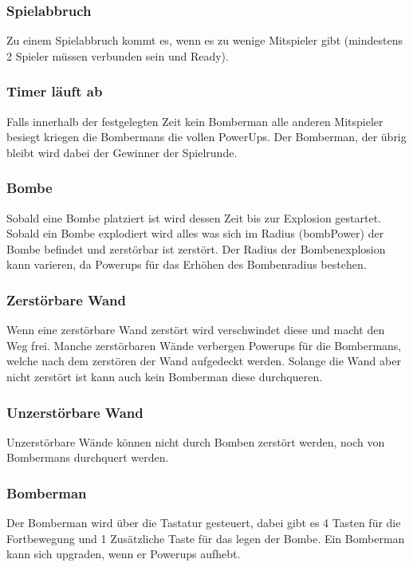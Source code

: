 \documentclass[11pt]{scrartcl}
\begin{document}
\subsubsection{Spielabbruch}
\label{sec:Spielabbruch}
Zu einem Spielabbruch kommt es, wenn es zu wenige Mitspieler gibt 
(mindestens 2 Spieler müssen verbunden sein und Ready).

\subsubsection{Timer läuft ab}
\label{sec:Timer läuft ab}
Falls innerhalb der festgelegten Zeit kein Bomberman alle anderen Mitspieler besiegt 
kriegen die Bombermans die vollen PowerUps.
Der Bomberman, der übrig bleibt wird dabei der Gewinner der Spielrunde.

\subsubsection{Bombe}
\label{sec:Bombe}
Sobald eine Bombe platziert ist wird dessen \grqq{}Zeit 
bis zur Explosion gestartet\grqq{}.
Sobald ein Bombe explodiert wird alles was sich im Radius 
(bombPower) der Bombe befindet und zerstörbar ist zerstört.
Der Radius der Bombenexplosion kann varieren, da Powerups 
für das Erhöhen des Bombenradius bestehen.
\subsubsection{Zerstörbare Wand}
\label{sec:Zerstörbare Wand (DestroyableBlock)}
Wenn eine zerstörbare Wand zerstört wird verschwindet diese und macht den Weg frei.
Manche zerstörbaren Wände verbergen Powerups für die Bombermans, 
welche nach dem zerstören der Wand aufgedeckt werden.
Solange die Wand aber nicht zerstört ist kann auch kein Bomberman diese durchqueren.

\subsubsection{Unzerstörbare Wand}
\label{sec:Unzerstörbare Wand}
Unzerstörbare Wände können nicht durch Bomben zerstört werden, 
noch von Bombermans durchquert werden.

\subsubsection{Bomberman}
\label{sec:Bomberman}
Der Bomberman wird über die Tastatur gesteuert, dabei gibt es 4 
Tasten für die Fortbewegung und 1 Zusätzliche Taste für das legen der Bombe.
Ein Bomberman kann sich \grqq{}upgraden\grqq{}, wenn er Powerups aufhebt.
\end{document}
